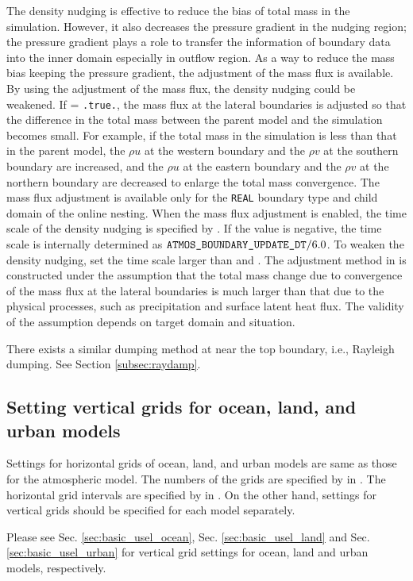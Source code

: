 The density nudging is effective to reduce the bias of total mass in the simulation. However, it also decreases the pressure gradient in the nudging region; the pressure gradient plays a role to transfer the information of boundary data into the inner domain especially in outflow region.
As a way to reduce the mass bias keeping the pressure gradient, the adjustment of the mass flux is available.
By using the adjustment of the mass flux, the density nudging could be weakened.
%
If  = \verb|.true.|,
the mass flux at the lateral boundaries is adjusted so that the difference in the total mass between the parent model and the simulation becomes small.
For example, if the total mass in the simulation is less than that in the parent model, the $\rho u$ at the western boundary and the $\rho v$ at the southern boundary are increased, and the $\rho u$ at the eastern boundary and the $\rho v$ at the northern boundary are decreased to enlarge the total mass convergence.
The mass flux adjustment is available only for the \verb|REAL| boundary type and child domain of the online nesting.
When the mass flux adjustment is enabled, the time scale of the density nudging is specified by .
If the value is negative, the time scale is internally determined as $\nmitemeq{ATMOS_BOUNDARY_UPDATE_DT} / 6.0$.
To weaken the density nudging, set the time scale larger than  and .
The adjustment method in \scalerm is constructed under the assumption that the total mass change due to convergence of the mass flux at the lateral boundaries is much larger than that due to the physical processes, such as precipitation and surface latent heat flux.
The validity of the assumption depends on target domain and situation.

There exists a similar dumping method at near the top boundary, i.e., Rayleigh dumping. See Section \ref{subsec:raydamp}.

\subsection{Setting vertical grids for ocean, land, and urban models} \label{subsec:gridolu}

Settings for horizontal grids of ocean, land, and urban models are same as those for the atmospheric model.
The numbers of the grids are specified by  in .
The horizontal grid intervals are specified by  in .
On the other hand, settings for vertical grids should be specified for each model separately.

Please see Sec. \ref{sec:basic_usel_ocean}, Sec. \ref{sec:basic_usel_land} and Sec. \ref{sec:basic_usel_urban}
for vertical grid settings for ocean, land and urban models, respectively.
